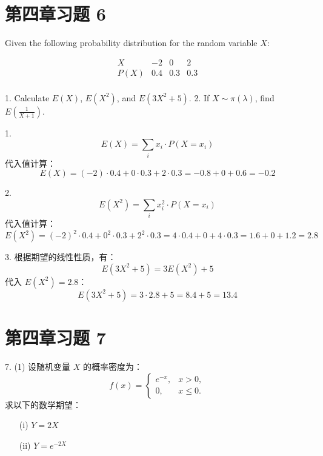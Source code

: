 \documentclass[twoside]{article}
\begin{document}
\maketitle
\vspace{-3.5em}

\tableofcontents

\section{第四章习题 6}

Given the following probability distribution for the random variable \( X \):

\[
\begin{array}{c|ccc}
X & -2 & 0 & 2 \\
\hline
P(X) & 0.4 & 0.3 & 0.3 \\
\end{array}
\]

1. Calculate \( E(X) \), \( E(X^2) \), and \( E(3X^2 + 5) \).
2. If \( X \sim \pi(\lambda) \), find \( E\left(\frac{1}{X+1}\right) \).

\begin{ans}{6}{6}

    1.
    \[
    E(X) = \sum_{i} x_i \cdot P(X = x_i)
    \]
    代入值计算：
    \[
    E(X) = (-2) \cdot 0.4 + 0 \cdot 0.3 + 2 \cdot 0.3 = -0.8 + 0 + 0.6 = -0.2
    \]
 
    2.
    \[
    E(X^2) = \sum_{i} x_i^2 \cdot P(X = x_i)
    \]
    代入值计算：
    \[
    E(X^2) = (-2)^2 \cdot 0.4 + 0^2 \cdot 0.3 + 2^2 \cdot 0.3 = 4 \cdot 0.4 + 0 + 4 \cdot 0.3 = 1.6 + 0 + 1.2 = 2.8
    \]

    3.
    根据期望的线性性质，有：
    \[
    E(3X^2 + 5) = 3E(X^2) + 5
    \]
    代入 \( E(X^2) = 2.8 \)：
    \[
    E(3X^2 + 5) = 3 \cdot 2.8 + 5 = 8.4 + 5 = 13.4
    \]
\end{ans}

\section{第四章习题 7}

7. (1) 设随机变量 \( X \) 的概率密度为：
   \[
   f(x) = 
   \begin{cases}
      e^{-x}, & x > 0, \\
      0, & x \leq 0.
   \end{cases}
   \]
   求以下的数学期望：
   \begin{itemize}
       \item[(i)] \( Y = 2X \)
       \item[(ii)] \( Y = e^{-2X} \)
   \end{itemize}
\end{document}
